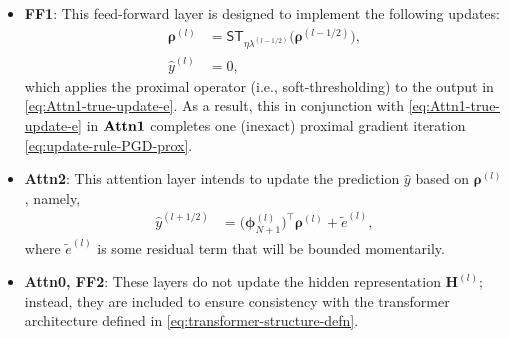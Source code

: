 \documentclass[english]{article}
\begin{document}
\begin{itemize}
\item \textbf{FF1}: This feed-forward layer is designed to implement the following updates: 
%
\begin{subequations}
\label{eq:equiv-update-FF1}
\begin{align}
{\bm \rho}^{(l)} &=\mathsf{ST}_{\eta\lambda^{(l-1/2)}}\big({\bm \rho}^{(l-1/2)}\big), \\
\widehat{y}^{(l)} &=0,
\end{align}
\end{subequations}
%
which applies the proximal operator (i.e., soft-thresholding) to the output in \eqref{eq:Attn1-true-update-e}. As a result, this in conjunction with \eqref{eq:Attn1-true-update-e} in $\bf{Attn1}$ completes one (inexact) proximal gradient iteration \eqref{eq:update-rule-PGD-prox}. 


\item \textbf{Attn2}:
This attention layer intends to update the prediction $\widehat{y}$ based on $\bm{\rho}^{(l)}$, namely,
%
\begin{align}\label{eq:update-haty}
\widehat{y}^{(l+1/2)} 
&=  \big({\bm \phi}_{N+1}^{(l)}\big)^{\top}{\bm \rho}^{(l)} + \widetilde{e}^{(l)},
\end{align}
%
where  $\widetilde{e}^{(l)}$ is some residual term that will be bounded momentarily. 

\item \textbf{Attn0, FF2}:
These layers do not update the hidden representation ${\bm H}^{(l)}$; instead, they are included to ensure consistency with the transformer architecture defined in \eqref{eq:transformer-structure-defn}. 
\end{itemize}
\end{document}
